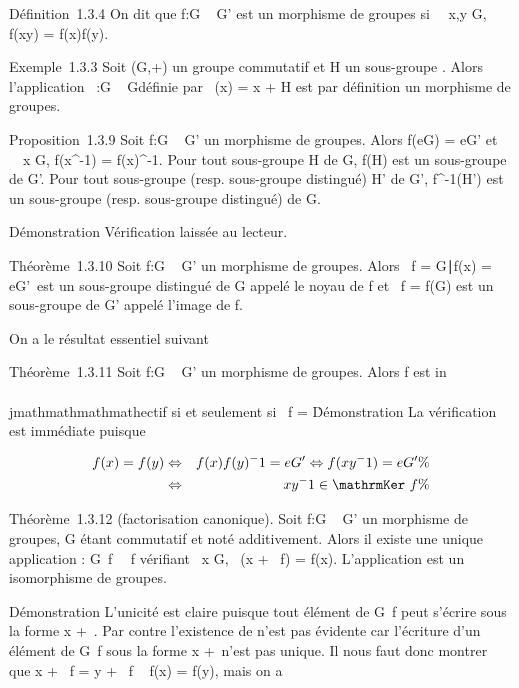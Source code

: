 Définition~1.3.4 On dit que f:G \rightarrow~ G' est un morphisme de groupes si
\forall~~x,y \in G, f(xy) = f(x)f(y).

Exemple~1.3.3 Soit (G,+) un groupe commutatif et H un sous-groupe .
Alors l'application \pi~:G \rightarrow~ G\diagupH définie par \pi~(x) = x + H est par
définition un morphisme de groupes.

Proposition~1.3.9 Soit f:G \rightarrow~ G' un morphisme de groupes. Alors
f(eG) = eG' et \forall~~x \in G,
f(x^-1) = f(x)^-1. Pour tout sous-groupe H de G,
f(H) est un sous-groupe de G'. Pour tout sous-groupe (resp. sous-groupe
distingué) H' de G', f^-1(H') est un sous-groupe (resp.
sous-groupe distingué) de G.

Démonstration Vérification laissée au lecteur.

Théorème~1.3.10 Soit f:G \rightarrow~ G' un morphisme de groupes. Alors
\mathrmKer~f =
\x \in G∣f(x) =
eG'\ est un sous-groupe distingué de G appelé
le noyau de f et \mathrmIm~f
= f(G) est un sous-groupe de G' appelé l'image de f.

On a le résultat essentiel suivant

Théorème~1.3.11 Soit f:G \rightarrow~ G' un morphisme de groupes. Alors f est
in\\\\jmathmathmathmathectif si et seulement si
\mathrmKer~f =
\eG\.

Démonstration La vérification est immédiate puisque

\begin{align*} f(x) = f(y)&
\Leftrightarrow & f(x)f(y)^-1 = e G'
\Leftrightarrow f(xy^-1) = e G'\%&
\\ & \Leftrightarrow &
xy^-1
\in\mathrmKer~f \%&
\\ \end{align*}

Théorème~1.3.12 (factorisation canonique). Soit f:G \rightarrow~ G' un morphisme de
groupes, G étant commutatif et noté additivement. Alors il existe une
unique application \overlinef :
G\diagup\mathrmKer~f
\rightarrow~\mathrmIm~f vérifiant
\forall~x \in G, \overlinef~(x
+ \mathrmKer~f) = f(x).
L'application \overlinef est un isomorphisme de
groupes.

Démonstration L'unicité est claire puisque tout élément de
G\diagup\mathrmKer~f peut s'écrire
sous la forme x +\
\mathrmKerf. Par contre l'existence de
\overlinef n'est pas évidente car l'écriture d'un
élément de G\diagup\mathrmKer~f
sous la forme x +\
\mathrmKerf n'est pas unique. Il nous faut donc
montrer que x + \mathrmKer~f
= y + \mathrmKer~f \rigtharrow~ f(x) =
f(y), mais on a

